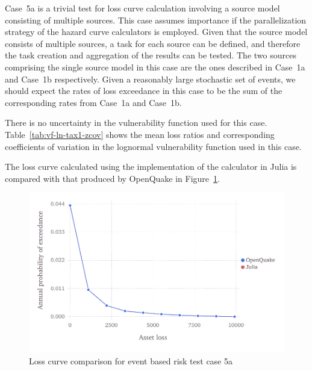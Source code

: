 Case~5a is a trivial test for loss curve calculation involving a source model consisting of multiple sources. This case assumes importance if the parallelization strategy of the hazard curve calculators is employed. Given that the source model consists of multiple sources, a task for each source can be defined, and therefore the task creation and aggregation of the results can be tested. The two sources comprising the single source model in this case are the ones described in Case~1a and Case~1b respectively. Given a reasonably large stochastic set of events, we should expect the rates of loss exceedance in this case to be the sum of the corresponding rates from Case~1a and Case~1b.

There is no uncertainty in the vulnerability function used for this case. Table~\ref{tab:vf-ln-tax1-zcov} shows the mean loss ratios and corresponding coefficients of variation in the lognormal vulnerability function used in this case.

The loss curve calculated using the implementation of the calculator in Julia is compared with that produced by OpenQuake in Figure~\ref{fig:lc-ebr-5a}.

\begin{figure}[htbp]
\centering
\includegraphics[width=12cm]{qareport/figures/fig-lc-ebr-5a}
\caption{Loss curve comparison for event based risk test case 5a}
\label{fig:lc-ebr-5a}
\end{figure}